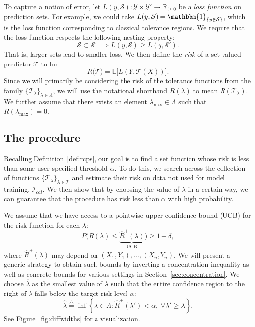 \documentclass[10pt]{article}
\def\Ical{\mathcal{I}}
\def\R{\mathbb{R}}
\def\E{\mathbb{E}}
\def\Tau{\mathcal{T}}
\newcommand{\Y}{\mathcal{Y}}
\newcommand{\T}{\mathcal{T}}
\renewcommand{\S}{\mathcal{S}}
\newcommand{\lhat}{\hat{\lambda}}
\newcommand{\Rhat}{\widehat{R}}
\newcommand{\ind}[1]{\mathbbm{1}_{\left\{#1\right\}}}
\newcommand{\triangleq}{\stackrel{\triangle}{=}}
\begin{document}
To capture a notion of error, let $L(y, \S) : \Y \times \Y' \to \R_{\ge 0}$ be a {\em loss function} on prediction sets. For example, we could take $L(y, \S) = \ind{y \notin \S}$, which is the loss function corresponding to classical tolerance regions. We require that the loss function respects the following nesting property:
\begin{equation}
\S \subset \S' \implies L(y, \S) \ge L(y, \S').
\label{eq:monotone_loss}
\end{equation}
That is, larger sets lead to smaller loss. 
We then define the {\em risk} of a set-valued predictor $\T$ to be
\begin{equation*}
R\big(\T) = \E\big[L(Y, \T(X))\big].
\end{equation*}
Since we will primarily be considering the risk of the tolerance functions from the family $\{\T_\lambda\}_{\lambda \in \Lambda}$, we will use the notational shorthand $R(\lambda)$ to mean $R(\T_\lambda)$. We further assume that there exists an element $\lambda_{\max}\in \Lambda$ such that $R(\lambda_{\max}) = 0$.



\subsection{The procedure}
Recalling Definition~\ref{def:rcps}, our goal is to find a set function whose risk is less than some user-specified threshold $\alpha$. 
To do this, we search across the collection of functions $\{\T_\lambda\}_{\lambda \in \Tau}$ and estimate their risk on data not used for model training, $\Ical_{cal}$.
We then show that by choosing the value of $\lambda$ in a certain way, we can guarantee that the procedure has risk less than $\alpha$ with high probability. 

We assume that we have access to a pointwise upper confidence bound (UCB) for the risk function for each $\lambda$:
\begin{equation}
    P\bigg(R(\lambda) \le \underbrace{\widehat{R}^+(\lambda)}_{\text{UCB}} \bigg) \ge 1 - \delta,
\label{eq:general_bound}
\end{equation}
where $\widehat{R}^+(\lambda)$ may depend on $(X_1, Y_1), \dots, (X_n, Y_n)$. 
We will present a generic strategy to obtain such bounds by inverting a concentration inequality as well as concrete bounds for various settings in Section~\ref{sec:concentration}. We choose $\lhat$ as the smallest value of $\lambda$ such that the entire confidence region to the right of $\lambda$ falls below the target risk level $\alpha$: 
\begin{equation}
\lhat \triangleq \inf \left\{\lambda \in \Lambda : \Rhat^+(\lambda') < \alpha, \,\, \forall \lambda' \ge \lambda \right\}.
\label{eq:lambda_hat_def}
\end{equation}
See Figure~\ref{fig:diffwidths} for a visualization.
\end{document}
